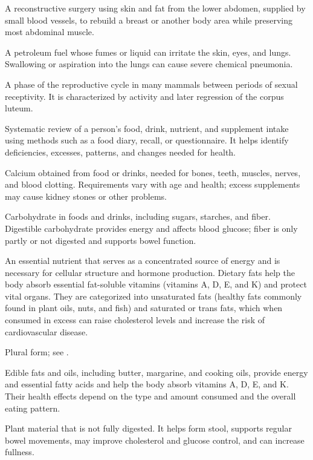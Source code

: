 A reconstructive surgery using skin and fat from the lower abdomen, supplied by small blood vessels, to rebuild a breast or another body area while preserving most abdominal muscle.

 A petroleum fuel whose fumes or liquid can irritate the skin, eyes, and lungs. Swallowing or aspiration into the lungs can cause severe chemical pneumonia.

 A phase of the reproductive cycle in many mammals between periods of sexual receptivity. It is characterized by activity and later regression of the corpus luteum.

 Systematic review of a person’s food, drink, nutrient, and supplement intake using methods such as a food diary, recall, or questionnaire. It helps identify deficiencies, excesses, patterns, and changes needed for health.

 Calcium obtained from food or drinks, needed for bones, teeth, muscles, nerves, and blood clotting. Requirements vary with age and health; excess supplements may cause kidney stones or other problems.

 Carbohydrate in foods and drinks, including sugars, starches, and fiber. Digestible carbohydrate provides energy and affects blood glucose; fiber is only partly or not digested and supports bowel function.

 An essential nutrient that serves as a concentrated source of energy and is necessary for cellular structure and hormone production. Dietary fats help the body absorb essential fat-soluble vitamins (vitamins A, D, E, and K) and protect vital organs. They are categorized into unsaturated fats (healthy fats commonly found in plant oils, nuts, and fish) and saturated or trans fats, which when consumed in excess can raise cholesterol levels and increase the risk of cardiovascular disease.

 Plural form; see .

 Edible fats and oils, including butter, margarine, and cooking oils, provide energy and essential fatty acids and help the body absorb vitamins A, D, E, and K. Their health effects depend on the type and amount consumed and the overall eating pattern.

 Plant material that is not fully digested. It helps form stool, supports regular bowel movements, may improve cholesterol and glucose control, and can increase fullness.

